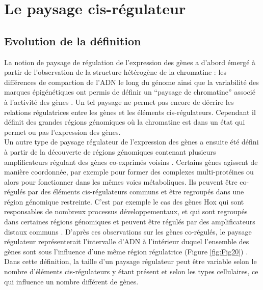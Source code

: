 \section{Le paysage \gls{cis}-régulateur}
\label{sec:paysage-cis-regul}

\subsection{Evolution de la définition}
\label{subsec:evol-def}

La notion de paysage de régulation de l’expression des gènes a d’abord émergé à partir de l’observation de la structure hétérogène de la chromatine : les différences de compaction de l’ADN le long du génome ainsi que la variabilité des marques épigénétiques ont permis de définir un “paysage de chromatine” associé à l’activité des gènes \citep{grewal_heterochromatin_2003}. Un tel paysage ne permet pas encore de décrire les relations régulatrices entre les gènes et les éléments \gls{cis}-régulateurs. Cependant il définit des grandes régions génomiques où la chromatine est dans un état qui permet ou pas l’expression des gènes. \\

Un autre type de paysage régulateur de l’expression des gènes a ensuite été défini à partir de la découverte de régions génomiques contenant plusieurs \glspl{amplificateur} régulant des gènes co-exprimés voisins \citep{spitz_global_2003}. Certains gènes agissent de manière coordonnée, par exemple pour former des complexes multi-protéines ou alors pour fonctionner dans les mêmes voies métaboliques. Ils peuvent être co-régulés par des éléments \gls{cis}-régulateurs communs et être regroupés dans une région génomique restreinte. C’est par exemple le cas des gènes Hox qui sont responsables de nombreux processus développementaux, et qui sont regroupés dans certaines régions génomiques et peuvent être régulés par des \glspl{amplificateur} distaux communs \citep{spitz_global_2008}. D’après ces observations sur les gènes co-régulés, le paysage régulateur représenterait l’intervalle d’ADN à l’intérieur duquel l’ensemble des gènes sont sous l’influence d’une même région régulatrice (Figure \ref{fig:Fig20}) \citep{spitz_global_2003}. Dans cette définition, la taille d’un paysage régulateur peut être variable selon le nombre d’éléments \gls{cis}-régulateurs y étant présent et selon les types cellulaires, ce qui influence un nombre différent de gènes. \\

